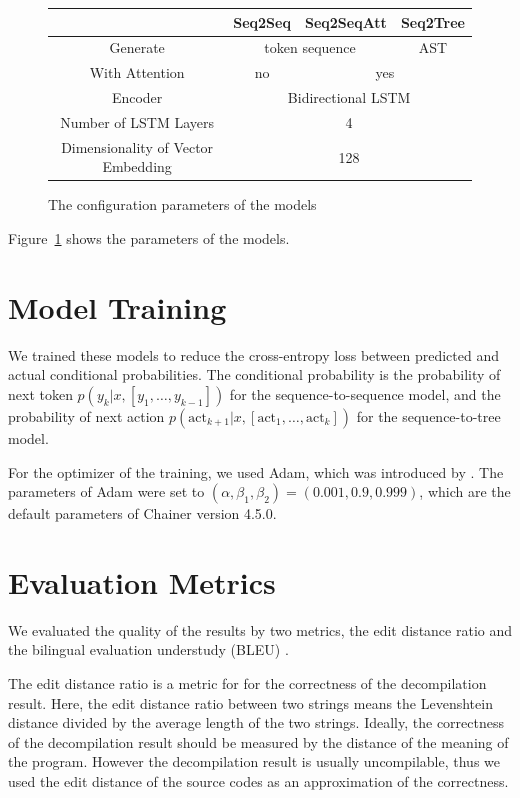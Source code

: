 \documentclass[senior,final,11pt]{iscs-thesis}
\begin{document}
\begin{figure}[t]
	\caption{The configuration parameters of the models}
	\begin{tabular}{|c||c|c|c|}
		\hline
		  & Seq2Seq & Seq2SeqAtt & Seq2Tree \\ \hline \hline
		 Generate & \multicolumn{2}{|c|}{token sequence} & AST \\ \hline
		 With Attention & no & \multicolumn{2}{|c|}{yes} \\ \hline
		 Encoder & \multicolumn{3}{|c|}{Bidirectional LSTM} \\ \hline
		Number of LSTM Layers & \multicolumn{3}{|c|}{4} \\ \hline
		Dimensionality of Vector Embedding & \multicolumn{3}{|c|}{128} \\ \hline
	\end{tabular}
	\label{fig:parameterofmodels}
\end{figure}

Figure~\ref{fig:parameterofmodels} shows the parameters of the models. 


\section{Model Training}
We trained these models to reduce the cross-entropy loss between predicted and actual conditional probabilities.
The conditional probability is the probability of next token $ p(y_k|x,[y_1,\dots,y_{k-1}]) $ for the sequence-to-sequence model, 
and the probability of next action $p(\mathrm{act}_{k+1}|x,[\mathrm{act}_1, \dots, \mathrm{act}_{k}]) $ for the sequence-to-tree model.

For the optimizer of the training, we used Adam, which was introduced by \citet{Adam}.
The parameters of Adam were set to $ (\alpha,\beta_1,\beta_2) = (0.001,0.9,0.999) $, which are the default parameters of Chainer version 4.5.0.

\section{Evaluation Metrics}
We evaluated the quality of the results by two metrics, 
the edit distance ratio and the bilingual evaluation understudy (BLEU) \citep{BLEU}.

The edit distance ratio is a metric for for the correctness of the decompilation result.
Here, the edit distance ratio between two strings means the Levenshtein distance \citep{levensthein_dist} divided by the average length of the two strings.
Ideally, the correctness of the decompilation result should be measured by the distance of the meaning of the program.
However the decompilation result is usually uncompilable, 
thus we used the edit distance of the source codes as an approximation of the correctness.
\end{document}
